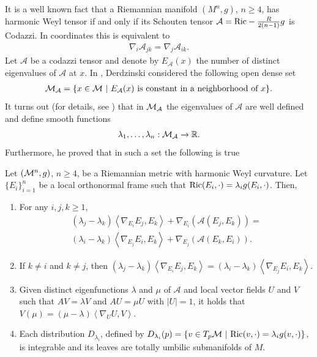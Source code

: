 It is a well known fact that a Riemannian manifold $(M^{n},g)$, $n\geq4$, has harmonic Weyl tensor if and only if its Schouten tensor $\mathcal{A}=\mathrm{Ric}-\frac{R}{2(n-1)}g$ is Codazzi. In coordinates this is equivalent to
\begin{align}
	\nabla_{i}\mathcal{A}_{jk}=\nabla_{j}\mathcal{A}_{ik}.
\end{align}
Let $\mathcal{A}$ be a codazzi tensor and denote by $E_{\mathcal{A}}(x)$ the number of distinct eigenvalues of $\mathcal{A}$ at $x$. In \cite{derd}, Derdzinski considered the following open dense set
\begin{align}
	\mathcal{M}_{\mathcal{A}}=\{x\in \mathcal{M} \ |  \ E_{\mathcal{A}}(x)\text{ is constant in a neighborhood of }x\}.
\end{align}
It turns out (for details, see ) that in $\mathcal{M}_{\mathcal{A}}$ the eigenvalues of $\mathcal{A}$ are well defined and define smooth functions \[\lambda_{1},\ldots,\lambda_{n}:\mathcal{M}_{\mathcal{A}}\to\mathbb{R}.\] Furthermore, he proved that in such a set the following is true
\begin{lema}\label{derdlema}
	Let $(\mathcal{M}^n,g)$, $n\geq4$, be a Riemannian metric with harmonic Weyl curvature. Let $\{E_{i}\}_{i=1}^{n}$ be a local orthonormal frame such that $\mathrm{Ric}(E_{i},\cdot)=\lambda_{i}g(E_{i},\cdot)$. Then,
	\begin{enumerate}
		\item\label{derd1} For any $i,j,k\geq1$,
		\begin{align*}
		(\lambda_{j}-\lambda_{k})\left\langle\nabla_{E_{i}}E_{j},E_{k}\right\rangle+\nabla_{E_{i}}(\mathcal{A}(E_{j},E_{k}))=\\
		(\lambda_{i}-\lambda_{k})\left\langle\nabla_{E_{j}}E_{i},E_{k}\right\rangle+\nabla_{E_{j}}(\mathcal{A}(E_{k},E_{i})).
		\end{align*}
		\item If $k\neq i$ and $k\neq j$, then $(\lambda_{j}-\lambda_{k})\left\langle\nabla_{E_{i}}E_{j},E_{k}\right\rangle=(\lambda_{i}-\lambda_{k})\left\langle\nabla_{E_{j}}E_{i},E_{k}\right\rangle$.
		\item Given distinct eigenfunctions $\lambda$ and $\mu$ of $\mathcal{A}$ and local vector fields $U$ and $V$ such that $AV=\lambda V$ and $AU=\mu U$ with $|U|=1$, it holds that $V(\mu)=(\mu-\lambda)\left\langle\nabla_{U}U,V\right\rangle$.
		\item Each distribution $D_{\lambda_{i}}$, defined by $D_{\lambda_{i}}(p)=\{v\in T_{p} \mathcal{M} \ | \ \mathrm{Ric}(v,\cdot)=\lambda_{i}g(v,\cdot)\}$, is integrable	 and its leaves are totally umbilic submanifolds of $M$.
	\end{enumerate}
\end{lema}


